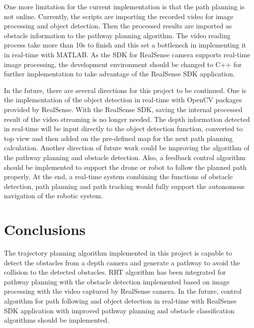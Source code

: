 \documentclass[
  oneside]{ubcthesis}
\begin{document}
One more limitation for the current implementation is that the path planning is not online. Currently, the scripts are importing the recorded video for image processing and object detection. Then the processed results are imported as obstacle information to the pathway planning algorithm. The video reading process take more than 10s to finish and this set a bottleneck in implementing it in real-time with MATLAB. As the SDK for RealSense camera supports real-time image processing, the development environment should be changed to C++ for further implementation to take advantage of the RealSense SDK application.

In the future, there are several directions for this project to be continued. One is the implementation of the object detection in real-time with OpenCV packages provided by RealSense. With the RealSense SDK, saving the internal processed result of the video streaming is no longer needed. The depth information detected in real-time will be input directly to the object detection function, converted to top view and then added on the pre-defined map for the next path planning calculation. Another direction of future work could be improving the algorithm of the pathway planning and obstacle detection. Also, a feedback control algorithm should be implemented to support the drone or robot to follow the planned path properly. At the end, a real-time system combining the functions of obstacle detection, path planning and path tracking would fully support the autonomous navigation of the robotic system.

\hypertarget{conclusions}{%
\chapter{Conclusions}\label{conclusions}}

The trajectory planning algorithm implemented in this project is capable to detect the obstacles from a depth camera and generate a pathway to avoid the collision to the detected obstacles. RRT algorithm has been integrated for pathway planning with the obstacle detection implemented based on image processing with the video captured by RealSense camera. In the future, control algorithm for path following and object detection in real-time with RealSense SDK application with improved pathway planning and obstacle classification algorithms should be implemented.

  
\end{document}
